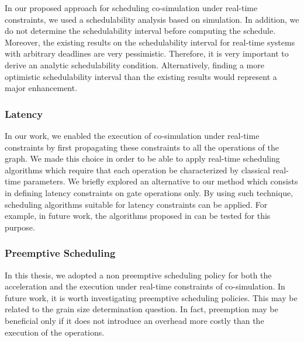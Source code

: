 In our proposed approach for scheduling co-simulation under real-time constraints, we used a schedulability analysis based on simulation. In addition, we do not determine the schedulability interval before computing the schedule. Moreover, the existing results on the schedulability interval for real-time systems with arbitrary deadlines are very pessimistic. Therefore, it is very important to derive an analytic schedulability condition. Alternatively, finding a more optimistic schedulability interval than the existing results would represent a major enhancement.

\subsubsection{Latency}

In our work, we enabled the execution of co-simulation under real-time constraints by first propagating these constraints to all the operations of the graph. We made this choice in order to be able to apply real-time scheduling algorithms which require that each operation be characterized by classical real-time parameters. We briefly explored an alternative to our method which consists in defining latency constraints on gate operations only. By using such technique, scheduling algorithms suitable for latency constraints can be applied. For example, in future work, the algorithms proposed in \cite{kermia:2009} can be tested for this purpose.  

\subsubsection{Preemptive Scheduling} 
In this thesis, we adopted a non preemptive scheduling policy for both the acceleration and the execution under real-time constraints of co-simulation. In future work, it is worth investigating preemptive scheduling policies. This may be related to the grain size determination question. In fact, preemption may be beneficial only if it does not introduce an overhead more costly than the execution of the operations.

